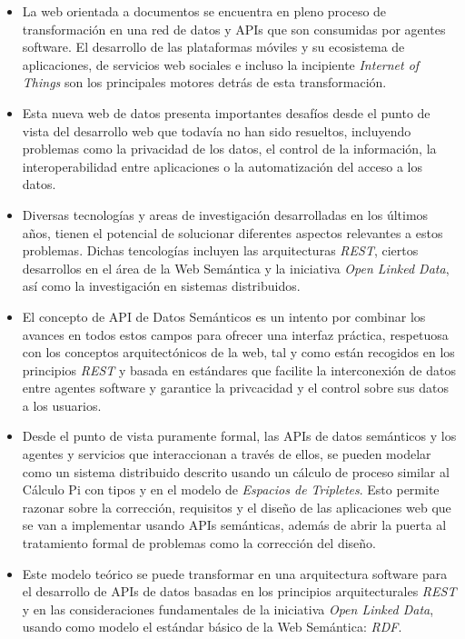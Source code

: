 \begin{itemize}
  \item La web orientada a documentos se encuentra en pleno proceso de transformaci\'on en una red de datos y APIs que son consumidas por agentes software. El desarrollo de las plataformas m\'oviles y su ecosistema de aplicaciones, de servicios web sociales e incluso la incipiente \textit{Internet of Things} \cite{atzori2010internet} son los principales motores detr\'as de esta transformaci\'on.
  \item Esta nueva web de datos presenta importantes desaf\'ios desde el punto de vista del desarrollo web que todav\'ia no han sido resueltos, incluyendo problemas como la privacidad de los datos, el control de la informaci\'on, la interoperabilidad entre aplicaciones o la automatizaci\'on del acceso a los datos.
  \item Diversas tecnolog\'ias y areas de investigaci\'on desarrolladas en los \'ultimos a\~nos, tienen el potencial de solucionar diferentes aspectos relevantes a estos problemas. Dichas tencolog\'ias incluyen las arquitecturas \textit{REST}, ciertos desarrollos en el \'area de la Web Sem\'antica y la iniciativa \textit{Open Linked Data}, as\'i como la investigaci\'on en sistemas distribuidos.
  \item El concepto de API de Datos Sem\'anticos es un intento por combinar los avances en todos estos campos para ofrecer una interfaz pr\'actica, respetuosa con los conceptos arquitect\'onicos de la web, tal y como est\'an recogidos en los principios \textit{REST} y basada en est\'andares que facilite la interconexi\'on de datos entre agentes software y garantice la privcacidad y el control sobre sus datos a los usuarios.
  \item Desde el punto de vista puramente formal, las APIs de datos sem\'anticos y los agentes y servicios que interaccionan a trav\'es de ellos, se pueden modelar como un sistema distribuido descrito usando un c\'alculo de proceso similar al C\'alculo Pi con tipos y en el modelo de \textit{Espacios de Tripletes}. Esto permite razonar sobre la correcci\'on, requisitos y el dise\~no de las aplicaciones web que se van a implementar usando APIs sem\'anticas, adem\'as de abrir la puerta al tratamiento formal de problemas como la correcci\'on del dise\~no.
  \item Este modelo te\'orico se puede transformar en una arquitectura software para el desarrollo de APIs de datos basadas en los principios arquitecturales \textit{REST} y en las consideraciones fundamentales de la iniciativa \textit{Open Linked Data}, usando como modelo el est\'andar b\'asico de la Web Sem\'antica: \textit{RDF}.

\end{itemize}

